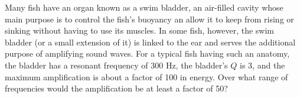 
Many fish have an organ known as a swim bladder, an
air-filled cavity whose main purpose is to control the
fish's buoyancy an allow it to keep from rising or sinking
without having to use its muscles. In some fish, however,
the swim bladder (or a small extension of it) is linked to
the ear and serves the additional purpose of amplifying
sound waves. For a typical fish having such an anatomy, the
bladder has a resonant frequency of 300 Hz, the bladder's
$Q$ is 3, and the maximum amplification is about a factor of
100 in energy. Over what range of frequencies would the
amplification be at least a factor of 50?
